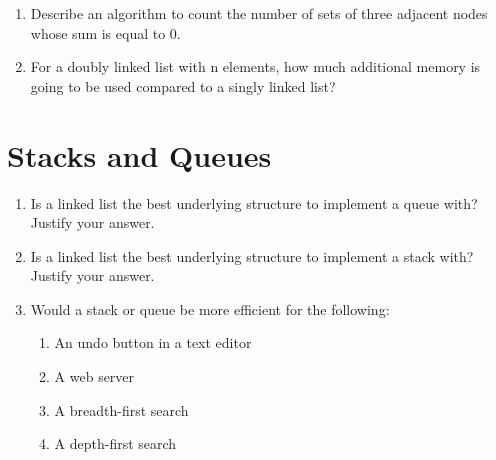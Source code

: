 \documentclass[11pt]{article}
\begin{document}
    \begin{enumerate}

        \item Describe an algorithm to count the number of sets of three adjacent nodes whose sum is equal to 0.

        \item For a doubly linked list with n elements, how much additional memory is going to be used compared to a singly linked list?

    \end{enumerate}

    \section{Stacks and Queues}
    \begin{enumerate}

        \item Is a linked list the best underlying structure to implement a queue with? Justify your answer.

        \item Is a linked list the best underlying structure to implement a stack with? Justify your answer.

        \item Would a stack or queue be more efficient for the following:
        \begin{enumerate}
            \item An undo button in a text editor
            \item A web server
            \item A breadth-first search
            \item A depth-first search
        \end{enumerate}
    \end{enumerate}

    \label{r:lastpage}

    
\end{document}
